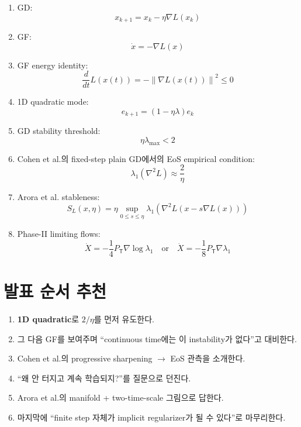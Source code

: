 \documentclass[11pt,a4paper,oneside,openany]{memoir}
\newcommand{\grad}{\nabla}
\newcommand{\Hess}{\nabla^2}
\newcommand{\norm}[1]{\left\lVert #1\right\rVert}
\newcommand{\T}{\mathsf{T}}
\theoremstyle{definition}
\begin{document}
\begin{enumerate}
  \item GD:
  \[
    \boxed{x_{k+1}=x_k-\eta\grad L(x_k)}
  \]

  \item GF:
  \[
    \boxed{\dot x=-\grad L(x)}
  \]

  \item GF energy identity:
  \[
    \boxed{\frac{d}{dt}L(x(t))=-\norm{\grad L(x(t))}^2\le0}
  \]

  \item 1D quadratic mode:
  \[
    \boxed{e_{k+1}=(1-\eta\lambda)e_k}
  \]

  \item GD stability threshold:
  \[
    \boxed{\eta\lambda_{\max}<2}
  \]

  \item Cohen et al.의 fixed-step plain GD에서의 EoS empirical condition:
  \[
    \boxed{\lambda_1(\Hess L)\approx\frac{2}{\eta}}
  \]

  \item Arora et al. stableness:
  \[
    \boxed{S_L(x,\eta)=\eta\sup_{0\le s\le\eta}
    \lambda_1\left(\Hess L(x-s\grad L(x))\right)}
  \]

  \item Phase-II limiting flows:
  \[
  \boxed{
  \dot X=-\frac14P_{\T}\grad\log\lambda_1
  \quad\text{or}\quad
  \dot X=-\frac18P_{\T}\grad\lambda_1
  }
  \]
\end{enumerate}

\section{발표 순서 추천}

\begin{enumerate}
  \item \textbf{1D quadratic}로 $2/\eta$를 먼저 유도한다.
  \item 그 다음 GF를 보여주며 ``continuous time에는 이 instability가 없다''고 대비한다.
  \item Cohen et al.의 progressive sharpening $\to$ EoS 관측을 소개한다.
  \item ``왜 안 터지고 계속 학습되지?''를 질문으로 던진다.
  \item Arora et al.의 manifold + two-time-scale 그림으로 답한다.
  \item 마지막에 ``finite step 자체가 implicit regularizer가 될 수 있다''로 마무리한다.
\end{enumerate}
\end{document}
